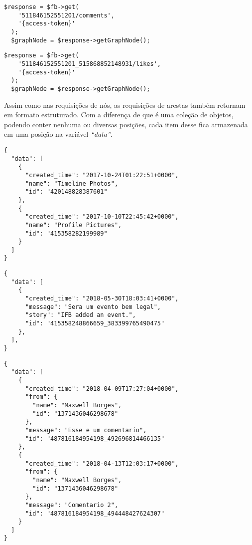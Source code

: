 \begin{lstlisting}[caption={Requisitar todos os comentários de uma postagem em uma página},label={lst:comentariosPostagem}]
  $response = $fb->get( 
    '511846152551201/comments', 
    '{access-token}'
  );
  $graphNode = $response->getGraphNode();
\end{lstlisting}

\begin{lstlisting}[caption={Requisitar todas as curtidas de um comentário},label={lst:curtidasComentario}]
  $response = $fb->get( 
    '511846152551201_515868852148931/likes', 
    '{access-token}'
  );
  $graphNode = $response->getGraphNode();
\end{lstlisting}

Assim como nas requisições de nós, as requisições de arestas também retornam em formato estruturado. Com a diferença de que é uma coleção de objetos, podendo conter nenhuma ou diversas posições, cada item desse fica armazenada em uma posição na variável \textit{``data''}. 

\begin{lstlisting}[caption={Resposta das requisições \ref{lst:albunsPagina}, \ref{lst:fotosPagina} e \ref{lst:videosPagina}  (Álbuns, Fotos e Videos)},label={lst:respostaAlbuns}]
{
  "data": [
    {
      "created_time": "2017-10-24T01:22:51+0000",
      "name": "Timeline Photos",
      "id": "420148828387601"
    },
    {
      "created_time": "2017-10-10T22:45:42+0000",
      "name": "Profile Pictures",
      "id": "415358282199989"
    }
  ]
}
\end{lstlisting}

\begin{lstlisting}[caption={Resposta da requisição \ref{lst:eventosPagina} (Eventos)},label={lst:respostaEventos}]
{
  "data": [
    {
      "created_time": "2018-05-30T18:03:41+0000",
      "message": "Sera um evento bem legal",
      "story": "IFB added an event.",
      "id": "415358248866659_383399765490475"
    },
  ],
}
\end{lstlisting} 

\begin{lstlisting}[caption={Resposta da requisição \ref{lst:comentariosPostagem} (Comentários)},label={lst:respostaComentarios}]
{
  "data": [
    {
      "created_time": "2018-04-09T17:27:04+0000",
      "from": {
        "name": "Maxwell Borges",
        "id": "1371436046298678"
      },
      "message": "Esse e um comentario",
      "id": "487816184954198_492696814466135"
    },
    {
      "created_time": "2018-04-13T12:03:17+0000",
      "from": {
        "name": "Maxwell Borges",
        "id": "1371436046298678"
      },
      "message": "Comentario 2",
      "id": "487816184954198_494448427624307"
    }
  ]
}
\end{lstlisting} 

